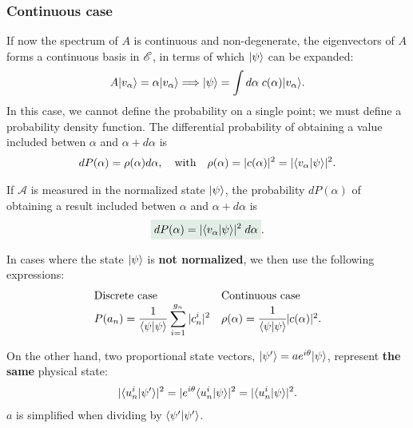 \subsubsection{Continuous case}
If now the spectrum of $A$ is continuous and non-degenerate, the eigenvectors of $A$ forms a continuous basis in $\mathscr{E}$, in terms of which $|\psi\rangle$ can be expanded: 
\begin{align*}
    A|v_\alpha\rangle=\alpha|v_\alpha\rangle\Longrightarrow|\psi\rangle=\int d\alpha\;c(\alpha)|v_\alpha\rangle.
\end{align*}
In this case, we cannot define the probability on a single point; we must define a probability density function. The differential probability of obtaining a value 
included betwen $\alpha$ and $\alpha+d\alpha$ is 
\begin{align*}
    dP(\alpha)=\rho(\alpha)d\alpha,\quad\text{with}\quad \rho(\alpha)=|c(\alpha)|^2=|\langle v_\alpha|\psi\rangle|^2.
\end{align*}

\begin{definition}
    If $\mathcal{A}$ is measured in the normalized state $|\psi\rangle$, the probability $dP(\alpha)$ of obtaining a result included 
    betwen $\alpha$ and $\alpha+d\alpha$ is 
    \begin{align}
        \highlight{dP(\alpha)=|\braket{v_\alpha|\psi}|^2\;d\alpha}.
    \end{align}
\end{definition}
In cases where the state $|\psi\rangle$ is \textbf{not normalized}, we then use the following expressions:
\begin{align}
    \begin{array}{ll}
    \text{Discrete case}&\text{Continuous case}\\
    P(a_n)=\displaystyle\frac{1}{\langle\psi|\psi\rangle}\sum_{i=1}^{g_n}|c^i_n|^2&\rho(\alpha)=\cfrac{1}{\langle\psi|\psi\rangle}|c(\alpha)|^2.        
    \end{array}
\end{align}

On the other hand, two proportional state vectors, $|\psi'\rangle=ae^{i\theta}|\psi\rangle$, represent \textbf{the same} physical state:
\begin{align*}
    |\langle u_n^i|\psi'\rangle|^2=|e^{i\theta}\langle u_n^i|\psi\rangle|^2=|\langle u_n^i|\psi\rangle|^2.
\end{align*}
$a$ is simplified when dividing by $\langle\psi'|\psi'\rangle$.

